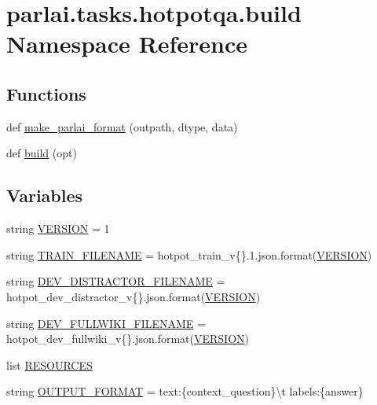 \hypertarget{namespaceparlai_1_1tasks_1_1hotpotqa_1_1build}{}\section{parlai.\+tasks.\+hotpotqa.\+build Namespace Reference}
\label{namespaceparlai_1_1tasks_1_1hotpotqa_1_1build}
\subsection*{Functions}
\begin{DoxyCompactItemize}
\item 
def \hyperlink{namespaceparlai_1_1tasks_1_1hotpotqa_1_1build_a11cd6bdcce0c267fa7bebb496d930b44}{make\+\_\+parlai\+\_\+format} (outpath, dtype, data)
\item 
def \hyperlink{namespaceparlai_1_1tasks_1_1hotpotqa_1_1build_a98853aa474b04fb50fa49cec3f1c3882}{build} (opt)
\end{DoxyCompactItemize}
\subsection*{Variables}
\begin{DoxyCompactItemize}
\item 
string \hyperlink{namespaceparlai_1_1tasks_1_1hotpotqa_1_1build_a57a5627d2111821eb32c42f113773b1a}{V\+E\+R\+S\+I\+ON} = \textquotesingle{}1\textquotesingle{}
\item 
string \hyperlink{namespaceparlai_1_1tasks_1_1hotpotqa_1_1build_a8987e1381df8f7e74c98455c4af7d1e8}{T\+R\+A\+I\+N\+\_\+\+F\+I\+L\+E\+N\+A\+ME} = \textquotesingle{}hotpot\+\_\+train\+\_\+v\{\}.\+1.json\textquotesingle{}.format(\hyperlink{namespaceparlai_1_1tasks_1_1hotpotqa_1_1build_a57a5627d2111821eb32c42f113773b1a}{V\+E\+R\+S\+I\+ON})
\item 
string \hyperlink{namespaceparlai_1_1tasks_1_1hotpotqa_1_1build_a86adac1f9e9da2911e21beaafefc2cee}{D\+E\+V\+\_\+\+D\+I\+S\+T\+R\+A\+C\+T\+O\+R\+\_\+\+F\+I\+L\+E\+N\+A\+ME} = \textquotesingle{}hotpot\+\_\+dev\+\_\+distractor\+\_\+v\{\}.json\textquotesingle{}.format(\hyperlink{namespaceparlai_1_1tasks_1_1hotpotqa_1_1build_a57a5627d2111821eb32c42f113773b1a}{V\+E\+R\+S\+I\+ON})
\item 
string \hyperlink{namespaceparlai_1_1tasks_1_1hotpotqa_1_1build_aabcca98f76be2304d8393dcf7ddc6648}{D\+E\+V\+\_\+\+F\+U\+L\+L\+W\+I\+K\+I\+\_\+\+F\+I\+L\+E\+N\+A\+ME} = \textquotesingle{}hotpot\+\_\+dev\+\_\+fullwiki\+\_\+v\{\}.json\textquotesingle{}.format(\hyperlink{namespaceparlai_1_1tasks_1_1hotpotqa_1_1build_a57a5627d2111821eb32c42f113773b1a}{V\+E\+R\+S\+I\+ON})
\item 
list \hyperlink{namespaceparlai_1_1tasks_1_1hotpotqa_1_1build_ad02488377cd4fceca268f32a92e7b29c}{R\+E\+S\+O\+U\+R\+C\+ES}
\item 
string \hyperlink{namespaceparlai_1_1tasks_1_1hotpotqa_1_1build_a48edb524c1cd509f9b1707f70aed4003}{O\+U\+T\+P\+U\+T\+\_\+\+F\+O\+R\+M\+AT} = \textquotesingle{}text\+:\{context\+\_\+question\}\textbackslash{}t\textquotesingle{} \textquotesingle{}labels\+:\{answer\}\textquotesingle{}
\end{DoxyCompactItemize}


